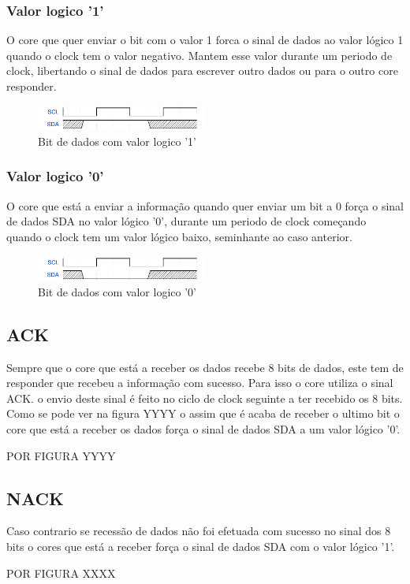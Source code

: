 \subsubsection{Valor logico '1'}
O core que quer enviar o bit com o valor 1 forca o sinal de dados ao valor lógico 1 quando o clock tem o valor negativo. Mantem esse valor durante um periodo de clock, libertando o sinal de dados para escrever outro dados ou para o outro core responder. 
 \begin{figure}[!htb]
   \centering
   \includegraphics[width=0.50\textwidth]{ondas/I2C_1.pdf}
   \caption[Bit de dados com valor logico '1']{Bit de dados com valor logico '1'}
   \label{fig:I2C_1}
 \end{figure}

\subsubsection{Valor logico '0'}
O core que está a enviar a informação quando quer enviar um bit a 0 força o sinal de dados SDA no valor lógico '0', durante um periodo de clock começando quando o clock tem um valor lógico baixo, seminhante ao caso anterior.

 \begin{figure}[!htb]
   \centering
   \includegraphics[width=0.50\textwidth]{ondas/I2C_0.pdf}
   \caption[Bit de dados com valor logico '0']{Bit de dados com valor logico '0'}
   \label{fig:I2C_0}
 \end{figure}
 
 

\subsection{ACK}
\label{i2c_ack}
Sempre que o core que está a receber os dados recebe 8 bits de dados, este tem de responder que recebeu a informação com sucesso. Para isso o core utiliza o sinal ACK. o envio deste sinal é feito no ciclo de clock seguinte a ter recebido os 8 bits. Como se pode ver na figura YYYY o assim que é acaba de receber o ultimo bit o core que está a receber os dados força o sinal de dados SDA a um valor lógico '0'.


POR FIGURA YYYY


\subsection{NACK}
\label{i2c_nack}
Caso contrario se recessão de dados não foi efetuada com sucesso no sinal dos 8 bits o cores que está a receber força o sinal de dados SDA com o valor lógico '1'.

POR FIGURA XXXX